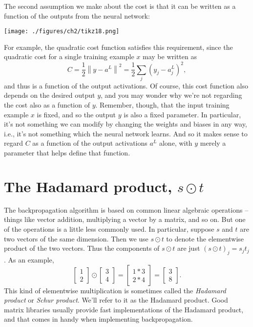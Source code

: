 \documentclass[a4paper,twoside,10pt]{book}
\begin{document}
The second assumption we make about the cost is that it can be written as a function of the outputs from the neural network:

\begin{center}
\texttt{[image: ./figures/ch2/tikz18.png]}
\end{center}
For example, the quadratic cost function satisfies this requirement, since the quadratic cost for a single training example $x$ may be written as
\begin{equation}
C = \frac{1}{2} \left\|y-a^L\right\|^2 = \frac{1}{2} \sum_j \left(y_j-a^L_j\right)^2,
\tag{27}\label{eq:27}
\end{equation}
and thus is a function of the output activations. Of course, this cost function also depends on the desired output $y$, and you may wonder why we're not regarding the cost also as a function of $y$. Remember, though, that the input training example $x$ is fixed, and so the output $y$ is also a fixed parameter. In particular, it's not something we can modify by changing the weights and biases in any way, i.e., it's not something which the neural network learns. And so it makes sense to regard $C$ as a function of the output activations $a^L$ alone, with $y$ merely a parameter that helps define that function.
\section{The Hadamard product, $s\odot{}t$}
The backpropagation algorithm is based on common linear algebraic operations -- things like vector addition, multiplying a vector by a matrix, and so on. But one of the operations is a little less commonly used. In particular, suppose $s$ and $t$ are two vectors of the same dimension. Then we use $s\odot{}t$ to denote the elementwise product of the two vectors. Thus the components of $s\odot{}t$ are just $(s \odot t)_j = s_j t_j$. As an example,
\begin{equation}
	\left[\begin{array}{c} 1 \\ 2 \end{array}\right] 
	\odot \left[\begin{array}{c} 3 \\ 4\end{array} \right]
	= \left[ \begin{array}{c} 1 * 3 \\ 2 * 4 \end{array} \right]
	= \left[ \begin{array}{c} 3 \\ 8 \end{array} \right].
	\tag{28}\label{eq:28}
\end{equation}
This kind of elementwise multiplication is sometimes called the \textit{Hadamard product} or \textit{Schur product}. We'll refer to it as the Hadamard product. Good matrix libraries usually provide fast implementations of the Hadamard product, and that comes in handy when implementing backpropagation.
\end{document}
